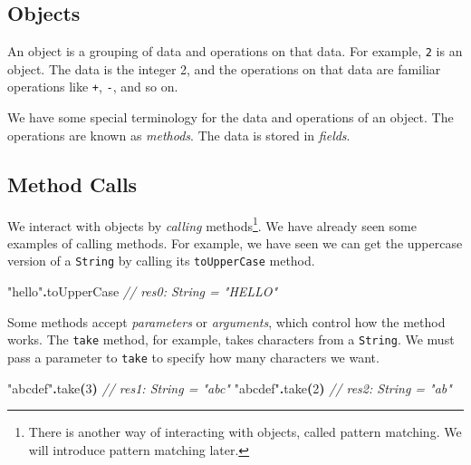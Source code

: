 \documentclass[11pt,a5paper,]{book}
\newenvironment{Shaded}{\begin{snugshade}}{\end{snugshade}}
\newcommand{\CommentTok}[1]{\textcolor[rgb]{0.56,0.35,0.01}{\textit{#1}}}
\newcommand{\DecValTok}[1]{\textcolor[rgb]{0.00,0.00,0.81}{#1}}
\newcommand{\FunctionTok}[1]{\textcolor[rgb]{0.00,0.00,0.00}{#1}}
\newcommand{\NormalTok}[1]{#1}
\newcommand{\OperatorTok}[1]{\textcolor[rgb]{0.81,0.36,0.00}{\textbf{#1}}}
\newcommand{\StringTok}[1]{\textcolor[rgb]{0.31,0.60,0.02}{#1}}
\begin{document}
\hypertarget{objects}{%
\subsection{Objects}\label{objects}}

An object is a grouping of data and operations on that data. For
example, \texttt{2} is an object. The data is the integer 2, and the
operations on that data are familiar operations like \texttt{+},
\texttt{-}, and so on.

We have some special terminology for the data and operations of an
object. The operations are known as \emph{methods}. The data is stored
in \emph{fields}.

\hypertarget{method-calls}{%
\subsection{Method Calls}\label{method-calls}}

We interact with objects by \emph{calling} methods\footnote{There is
  another way of interacting with objects, called pattern matching. We
  will introduce pattern matching later.}. We have already seen some
examples of calling methods. For example, we have seen we can get the
uppercase version of a \texttt{String} by calling its
\texttt{toUpperCase} method.

\begin{Shaded}
\begin{Highlighting}[]
\StringTok{"hello"}\OperatorTok{.}\NormalTok{toUpperCase}
\CommentTok{// res0: String = "HELLO"}
\end{Highlighting}
\end{Shaded}

Some methods accept \emph{parameters} or \emph{arguments}, which control
how the method works. The \texttt{take} method, for example, takes
characters from a \texttt{String}. We must pass a parameter to
\texttt{take} to specify how many characters we want.

\begin{Shaded}
\begin{Highlighting}[]
\StringTok{"abcdef"}\OperatorTok{.}\FunctionTok{take}\OperatorTok{(}\DecValTok{3}\OperatorTok{)}
\CommentTok{// res1: String = "abc"}
\StringTok{"abcdef"}\OperatorTok{.}\FunctionTok{take}\OperatorTok{(}\DecValTok{2}\OperatorTok{)}
\CommentTok{// res2: String = "ab"}
\end{Highlighting}
\end{Shaded}
\end{document}
